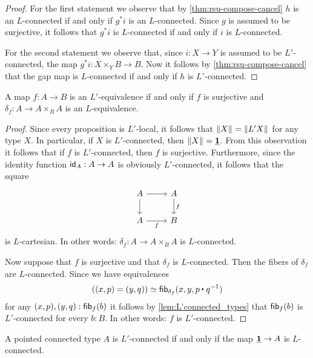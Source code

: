 \begin{proof}
For the first statement we observe that by \cref{thm:rsu-compose-cancel} $h$ is an $L$-connected if and only if $g^\ast i$ is an $L$-connected. Since $g$ is assumed to be surjective, it follows that $g^\ast i$ is $L$-connected if and only if $i$ is $L$-connected.

For the second statement we observe that, since $i:X\to Y$ is assumed to be $L'$-connected, the map $g^\ast i:X\times_Y B\to B$. Now it follows by \cref{thm:rsu-compose-cancel} that the gap map is $L$-connected if and only if $h$ is $L'$-connected.
\end{proof}

\begin{cor}
A map $f:A\to B$ is an $L'$-equivalence if and only if $f$ is surjective and $\delta_f:A\to A\times_B A$ is an $L$-equivalence.
\end{cor}

\begin{proof}
Since every proposition is $L'$-local, it follows that $\brck{X}=\brck{L'X}$ for any type $X$. In particular, if $X$ is $L'$-connected, then $\brck{X}=\unit$. From this observation it follows that if $f$ is $L'$-connected, then $f$ is surjective. Furthermore, since the identity function $\idfunc[A]:A\to A$ is obviously $L'$-connected, it follows that the square
\begin{equation*}
\begin{tikzcd}
A \arrow[d] \arrow[r] & A \arrow[d,"f"] \\
A \arrow[r,swap,"f"] & B
\end{tikzcd}
\end{equation*}
is $L$-cartesian. In other words: $\delta_f:A\to A\times_B A$ is $L$-connected.

Now suppose that $f$ is surjective and that $\delta_f$ is $L$-connected. Then the fibers of $\delta_f$ are $L$-connected. Since we have equivalences
\begin{equation*}
((x,p)=(y,q))\eqvsym \fib{\delta_f}{x,y,\ct{p}{q^{-1}}}
\end{equation*}
for any $(x,p),(y,q):\fib{f}{b}$ it follows by \cref{lem:L'connected_types} that $\fib{f}{b}$ is $L'$-connected for every $b:B$. In other words: $f$ is $L'$-connected.
\end{proof}

\begin{cor}
A pointed connected type $A$ is $L'$-connected if and only if the map $\unit\to A$ is $L$-connected.
\end{cor}

